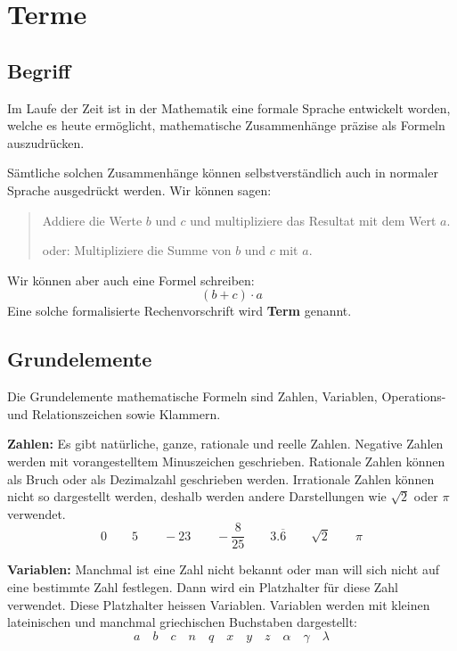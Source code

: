 \newpage
\section{Terme}

\subsection{Begriff}

Im Laufe der Zeit ist in der Mathematik eine formale Sprache entwickelt worden, welche es heute ermöglicht, mathematische Zusammenhänge präzise als Formeln auszudrücken.

Sämtliche solchen Zusammenhänge können selbstverständlich auch in normaler Sprache ausgedrückt werden. Wir können sagen:

\begin{quote}
Addiere die Werte $b$ und $c$ und multipliziere das Resultat mit dem Wert $a$.

oder: Multipliziere die Summe von $b$ und $c$ mit $a$.
\end{quote}

Wir können aber auch eine Formel schreiben:
\[
  (b+c)\cdot a
\]
Eine solche formalisierte Rechenvorschrift wird \textbf{Term} genannt.

\subsection{Grundelemente}

Die Grundelemente mathematische Formeln sind Zahlen, Variablen, Operations- und Relationszeichen sowie Klammern.

\textbf{Zahlen:} Es gibt natürliche, ganze, rationale und reelle Zahlen. Negative Zahlen werden mit vorangestelltem Minuszeichen geschrieben. Rationale Zahlen können als Bruch oder als Dezimalzahl geschrieben werden. Irrationale Zahlen können nicht so dargestellt werden, deshalb werden andere Darstellungen wie $\sqrt{2}$ oder $\pi$ verwendet.
\[
  0 \qquad 5 \qquad -23 \qquad -\frac{8}{25} \qquad 3.\overline{6} \qquad \sqrt{2} \qquad \pi
\]

\textbf{Variablen:} Manchmal ist eine Zahl nicht bekannt oder man will sich nicht auf eine bestimmte Zahl festlegen. Dann wird ein Platzhalter für diese Zahl verwendet. Diese Platzhalter heissen Variablen. Variablen werden mit kleinen lateinischen und manchmal griechischen Buchstaben dargestellt:
\[
  a \quad b \quad c \quad n \quad q \quad x \quad y \quad z \quad \alpha \quad \gamma \quad \lambda
\]

